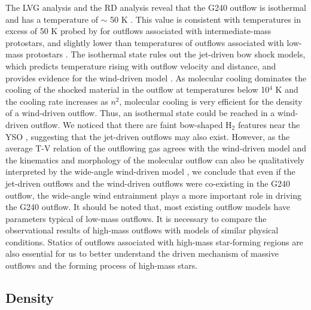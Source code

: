 The LVG analysis and the RD analysis reveal that the G240 outflow is isothermal and has a temperature of $\sim$ 50 K . This value is consistent with temperatures in excess of 50 K probed by \citet{2016A&A...587A..17V} for outflows associated with intermediate-mass protostars, and slightly lower than temperatures of outflows associated with low-mass protostars \citep{2009A&A...501..633V, 2012A&A...542A..86Y}. The isothermal state rules out the jet-driven bow shock models, which predicts temperature rising with outflow velocity and distance, and provides evidence for the wind-driven model \citep{2007prpl.conf..245A}. As molecular cooling dominates the cooling of the shocked material in the outflow at temperatures below 10$^4$ K \citep{1997IAUS..182..181H} and the cooling rate increases as $n^2$, molecular cooling is very efficient for the density of a wind-driven outflow. Thus, an isothermal state could be reached in a wind-driven outflow. We noticed that there are faint bow-shaped H$_{2}$ features near the YSO , suggesting that the jet-driven outflows may also exist. However, as the average T-V relation of the outflowing gas agrees with the wind-driven model and the kinematics and morphology of the molecular outflow can also be qualitatively interpreted by the wide-angle wind-driven model \citep{2009ApJ...696...66Q}, we conclude that even if the jet-driven outflows and the wind-driven outflows were co-existing in the G240 outflow, the wide-angle wind entrainment plays a more important role in driving the G240 outflow. It should be noted that, most existing outflow models have parameters typical of low-mass outflows. It is necessary to compare the observational results of high-mass outflows with models of similar physical conditions. Statics of outflows associated with high-mass star-forming regions are also essential for us to better understand the driven mechanism of massive outflows and the forming process of high-mass stars.

\subsection{Density}

